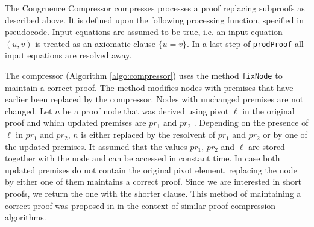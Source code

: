 


The Congruence Compressor compresses processes a proof replacing subproofs as described above. It is defined upon the following processing function, specified in pseudocode.
Input equations are assumed to be true, i.e. an input equation $(u,v)$ is treated as an axiomatic clause $\{u = v\}$.
In a last step of \texttt{prodProof} all input equations are resolved away.



The compressor (Algorithm \ref{algo:compressor}) uses the method \texttt{fixNode} to maintain a correct proof.
The method modifies nodes with premises that have earlier been replaced by the compressor. 
Nodes with unchanged premises are not changed.
Let $n$ be a proof node that was derived using pivot $\ell$ in the original proof and which updated premises are $pr_1$ and $pr_2$ .
Depending on the presence of $\ell$ in $pr_1$ and $pr_2$, $n$ is either replaced by the resolvent of $pr_1$ and $pr_2$ or by one of the updated premises.
It assumed that the values $pr_1$, $pr_2$ and $\ell$ are stored together with the node and can be accessed in constant time.
In case both updated premises do not contain the original pivot element, replacing the node by either one of them maintains a correct proof.
Since we are interested in short proofs, we return the one with the shorter clause.
This method of maintaining a correct proof was proposed in \cite{Bar-Ilan2008} in the context of similar proof compression algorithms.



\FloatBarrier
